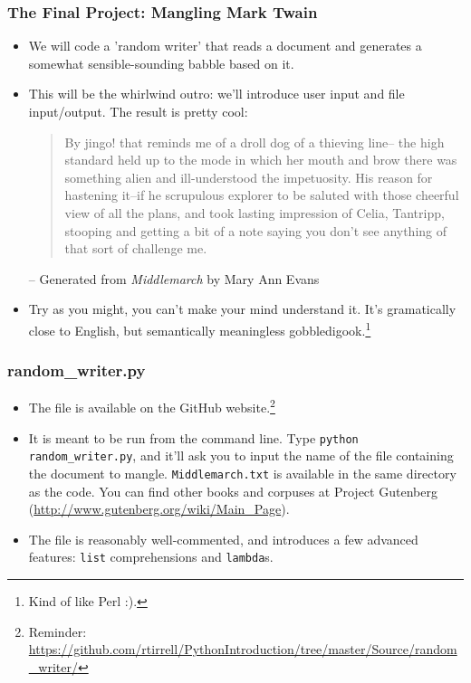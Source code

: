 \documentclass[10pt]{beamer}
\begin{document}
\begin{frame}
  \frametitle{The Final Project: Mangling Mark Twain}
  \begin{itemize}
    \item We will code a 'random writer' that reads a document and generates a somewhat sensible-sounding babble based on it.
    \item This will be the whirlwind outro: we'll introduce user input and file input/output.
      The result is pretty cool: \\
      \begin{quote}
        \small
        By jingo! that reminds me of a droll dog of a thieving line-- the high standard held up to the mode in which her mouth and brow there was something alien and ill-understood the impetuosity.  
        His reason for hastening it--if he scrupulous explorer to be saluted with those cheerful view of all the plans, and took lasting impression of Celia, Tantripp, stooping and getting a bit of a note saying you don't see anything of that sort of challenge me.
      \end{quote}
      \begin{flushright}
        \footnotesize -- Generated from \emph{Middlemarch} by Mary Ann Evans
      \end{flushright}
      \item Try as you might, you can't make your mind understand it.
        It's gramatically close to English, but semantically meaningless gobbledigook.\footnote{Kind of like Perl :).}
  \end{itemize}
\end{frame}

\begin{frame}
  \frametitle{random\_writer.py}
  \begin{itemize}
    \item The file is available on the GitHub website.\footnote{Reminder: \href{https://github.com/rtirrell/PythonIntroduction/tree/master/Source/random\_writer/}{https://github.com/rtirrell/PythonIntroduction/tree/master/Source/random\_writer/}}
    \item It is meant to be run from the command line.
      Type \texttt{python random\_writer.py}, and it'll ask you to input the name of the file containing the document to mangle.
      \texttt{Middlemarch.txt} is available in the same directory as the code.
      You can find other books and corpuses at Project Gutenberg (\href{http://www.gutenberg.org/wiki/Main\_Page}{http://www.gutenberg.org/wiki/Main\_Page}).
    \item The file is reasonably well-commented, and introduces a few advanced features: \texttt{list} comprehensions and \texttt{lambda}s.
  \end{itemize}
\end{frame}
\end{document}
